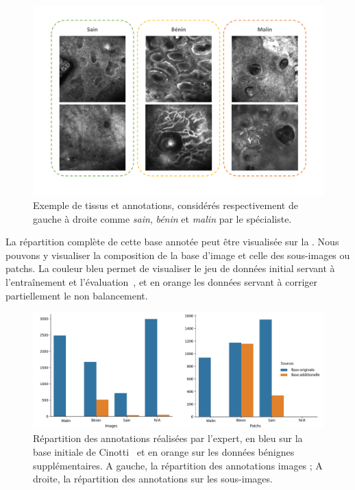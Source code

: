 \begin{figure}[H]
    \begin{center}
        \includegraphics[width=\linewidth]{contents/ii_preamble_microscopy/resources/example_rcm_data.pdf}
        \caption{Exemple de tissus et annotations, considérés respectivement de gauche à droite comme \textit{sain}, \textit{bénin} et \textit{malin} par le spécialiste.}
        \label{fig:example_rcm_data}
    \end{center} 
\end{figure}\par

La répartition complète de cette base annotée peut être visualisée sur la . Nous pouvons y visualiser la composition de la base d'image et celle des sous-images ou patchs. La couleur bleu permet de visualiser le jeu de données initial servant à l'entraînement et l'évaluation~\cite{Cinotti2018}, et en orange les données servant à corriger partiellement le non balancement.\par

\begin{figure}[H]
    \begin{center}
        \includegraphics[width=\linewidth]{contents/ii_preamble_microscopy/resources/scheme_rcm_statistics.pdf}
        \caption{Répartition des annotations réalisées par l'expert, en bleu sur la base initiale de Cinotti~\cite{Cinotti2018} et en orange sur les données bénignes supplémentaires. A gauche, la répartition des annotations images ; A droite, la répartition des annotations sur les sous-images.}
        \label{fig:scheme_rcm_statistics}
    \end{center} 
\end{figure}\par

